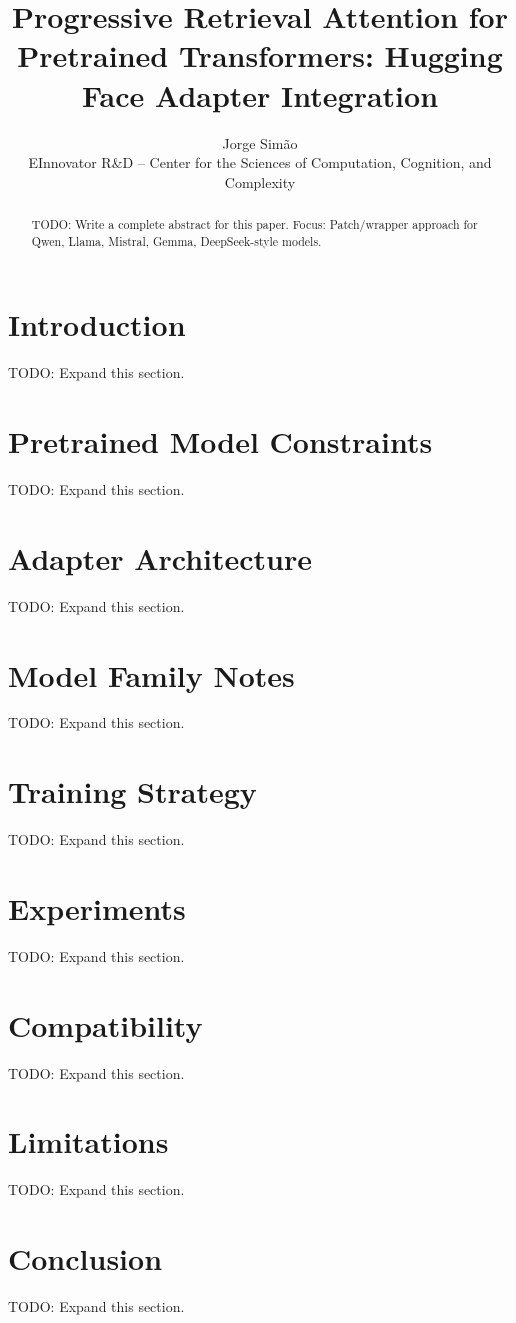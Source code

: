 \documentclass{article}
\title{Progressive Retrieval Attention for Pretrained Transformers: Hugging Face Adapter Integration}
\author{Jorge Simão\\EInnovator R\&D -- Center for the Sciences of Computation, Cognition, and Complexity}
\begin{document}
\maketitle
\begin{abstract}
TODO: Write a complete abstract for this paper. Focus: Patch/wrapper approach for Qwen, Llama, Mistral, Gemma, DeepSeek-style models.
\end{abstract}
\section{Introduction}
TODO: Expand this section.

\section{Pretrained Model Constraints}
TODO: Expand this section.

\section{Adapter Architecture}
TODO: Expand this section.

\section{Model Family Notes}
TODO: Expand this section.

\section{Training Strategy}
TODO: Expand this section.

\section{Experiments}
TODO: Expand this section.

\section{Compatibility}
TODO: Expand this section.

\section{Limitations}
TODO: Expand this section.

\section{Conclusion}
TODO: Expand this section.



\end{document}
